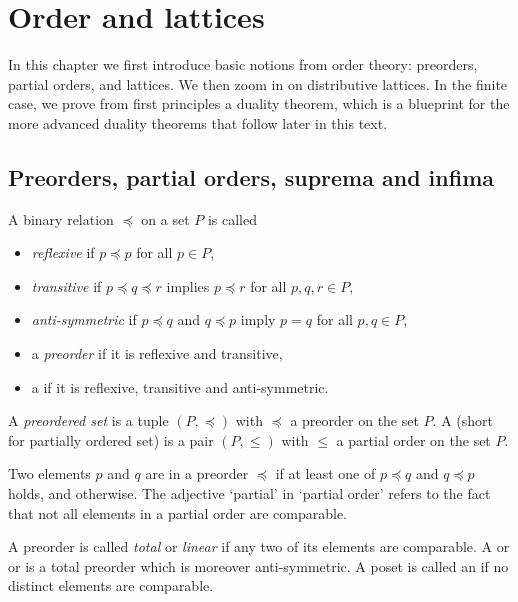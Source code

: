 \chapter{Order and lattices}\label{ch:order}

In this chapter we first introduce basic notions from order theory: preorders, partial orders, and lattices. We then zoom in on distributive lattices. In the finite case, we prove from first principles a duality theorem, which is a blueprint for the more advanced duality theorems that follow later in this text.

\section{Preorders, partial orders, suprema and infima}\label{sec:orders}
A binary relation $\preceq$ on a set $P$ is called
\begin{itemize}
\item \emph{reflexive} if $p \preceq p$ for all $p \in P$,
\item \emph{transitive} if $p \preceq q \preceq r$ implies $p \preceq r$ for all $p,q,r \in P$,
\item \emph{anti-symmetric} if $p \preceq q$ and $q \preceq p$ imply $p = q$ for all $p, q \in P$,
\item a \emph{preorder} if it is reflexive and transitive,
\item a  if it is reflexive, transitive and anti-symmetric.
\end{itemize}
A \emph{preordered set} is a tuple $(P,\preceq)$ with $\preceq$ a preorder on the set $P$. A  (short for partially ordered set) is a pair $(P,\leq)$ with $\leq$ a partial order on the set $P$.

Two elements $p$ and $q$ are  in a preorder $\preceq$ if at least one of $p \preceq q$ and $q \preceq p$ holds, and  otherwise. The adjective `partial' in `partial order' refers to the fact that not all elements in a partial order are comparable.

A preorder is called \emph{total} or \emph{linear} if any two of its elements are comparable.
A  or  or  is a total preorder which is moreover anti-symmetric. A poset is called an  if no distinct elements are comparable.

